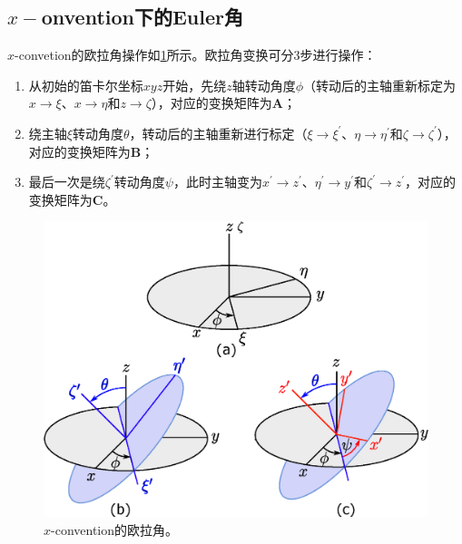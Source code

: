 \subsection{\texorpdfstring{$x-$}convention下的Euler角}
$x$-convetion的欧拉角操作如\cref{fig:x-euler-ang}所示。欧拉角变换可分3步进行操作：
\begin{enumerate}
    \item 从初始的笛卡尔坐标$xyz$开始，先绕$z$轴转动角度$\phi$（转动后的主轴重新标定为$x\rightarrow\xi$、$x\rightarrow\eta$和$z\rightarrow\zeta$），对应的变换矩阵为$\bm{A}$；
    \item 绕主轴$\xi$转动角度$\theta$，转动后的主轴重新进行标定（$\xi\rightarrow\xi^{\prime}$、$\eta\rightarrow\eta^{\prime}$和$\zeta\rightarrow\zeta^{\prime}$），对应的变换矩阵为$\bm{B}$；
    \item 最后一次是绕$\zeta^{\prime}$转动角度$\psi$，此时主轴变为$x^{\prime}\rightarrow z^{\prime}$、$\eta^{\prime}\rightarrow y^{\prime}$和$\zeta^{\prime}\rightarrow z^{\prime}$，对应的变换矩阵为$\bm{C}$。
\end{enumerate}
\begin{figure}[htb]
    \centering
    \setlength{\abovecaptionskip}{0.2cm}
    \includegraphics[scale=0.6]{./figure/classical-mechanics/Eular-angle.eps}
    \caption{$x$-convention的欧拉角。}
    \label{fig:x-euler-ang}
\end{figure}

